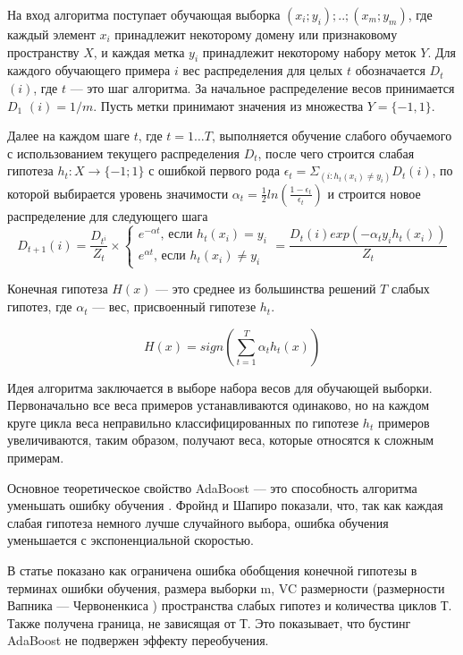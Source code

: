 \documentclass{article}
\begin{document}
\begin{articletext}
На вход алгоритма поступает обучающая выборка $(x_i;y_i);..;(x_m;y_m)$, где каждый элемент $x_i$ принадлежит некоторому домену или признаковому пространству $X$, и каждая метка $y_i$ принадлежит некоторому набору меток $Y$. Для каждого обучающего примера $i$ вес распределения для целых $t$ обозначается $D_t$ $(i)$, где $t$ --- это шаг алгоритма. За начальное распределение весов принимается $D_1$ $(i)= 1/m$. Пусть метки принимают значения из множества  $Y=\{-1,1\}$. 

Далее на каждом шаге $t$, где $t = 1 \ldots T$, выполняется обучение слабого обучаемого с использованием текущего распределения $D_t$, после чего строится слабая гипотеза $h_t: X \to \{-1; 1\}$ с ошибкой первого рода $\epsilon_t=\Sigma_{(i:h_t (x_i)\ne y_i)}D_t(i)$, по которой выбирается уровень значимости $\alpha_t=\frac{1}{2}ln(\frac{1-\epsilon_t}{\epsilon_t})$ и строится новое распределение для следующего шага
\bfullwidth
\begin{equation*}
D_{t+1}(i)=\frac{D_{t^i}}{Z_t} \times 
\begin{cases}
e^{-\alpha t}\text{, если }h_t (x_i) = y_i \\
e^{\alpha t}\text{, если }h_t (x_i)\ne y_i
\end{cases}
= \frac{D_t (i)exp(-\alpha_t y_i h_t (x_i))}{Z_t} 
\end{equation*}
\efullwidth

Конечная гипотеза $H(x)$ ---  это среднее из большинства решений $T$ слабых гипотез, где $\alpha_t$ --- вес, присвоенный гипотезе $h_t$.

\bfullwidth
\begin{equation*}
H(x)=sign(\sum_{t=1}^T\alpha_t h_t(x))
\end{equation*}
\efullwidth

Идея алгоритма заключается в выборе набора весов для обучающей выборки. Первоначально все веса примеров устанавливаются одинаково, но на каждом круге цикла веса неправильно классифицированных по гипотезе $h_t$ примеров увеличиваются, таким образом, получают веса, которые относятся к сложным примерам.

Основное теоретическое свойство AdaBoost --- это способность алгоритма уменьшать ошибку обучения \cite{Freund 1999}. Фройнд и Шапиро показали, что, так как каждая слабая гипотеза немного лучше случайного выбора, ошибка обучения уменьшается с экспоненциальной скоростью.

В статье \cite{Freund 1999} показано как ограничена ошибка обобщения конечной гипотезы в терминах ошибки обучения, размера выборки m, VC размерности (размерности Вапника --- Червоненкиса \cite{Schapire 1997}) пространства слабых гипотез и количества циклов Т. Также получена граница, не зависящая от Т. Это показывает, что бустинг AdaBoost не подвержен эффекту переобучения.


\end{articletext}
\end{document}
